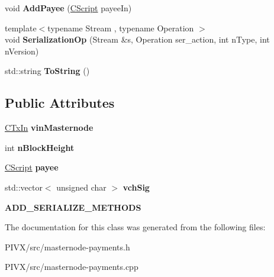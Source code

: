 \begin{DoxyCompactItemize}
void {\bfseries Add\+Payee} (\mbox{\hyperlink{class_c_script}{C\+Script}} payee\+In)
\item 
\mbox{\label{class_c_masternode_payment_winner_aa533f72a1a4fcee2b3d061d4e8b03bf6}} 
{\footnotesize template$<$typename Stream , typename Operation $>$ }\\void {\bfseries Serialization\+Op} (Stream \&s, Operation ser\+\_\+action, int n\+Type, int n\+Version)
\item 
\mbox{\label{class_c_masternode_payment_winner_a188f4b487f9481bdcc6d5b052793512e}} 
std\+::string {\bfseries To\+String} ()
\end{DoxyCompactItemize}
\subsection*{Public Attributes}
\begin{DoxyCompactItemize}
\item 
\mbox{\label{class_c_masternode_payment_winner_ab3242857185f9dbd6d38faeb31fdbe58}} 
\mbox{\hyperlink{class_c_tx_in}{C\+Tx\+In}} {\bfseries vin\+Masternode}
\item 
\mbox{\label{class_c_masternode_payment_winner_ae220dc7e74441f319751c24760ea670e}} 
int {\bfseries n\+Block\+Height}
\item 
\mbox{\label{class_c_masternode_payment_winner_a06110371aa9d82a6dbde904335cbfc5a}} 
\mbox{\hyperlink{class_c_script}{C\+Script}} {\bfseries payee}
\item 
\mbox{\label{class_c_masternode_payment_winner_a35844d9486f2c41ebf949e13d595247d}} 
std\+::vector$<$ unsigned char $>$ {\bfseries vch\+Sig}
\item 
\mbox{\label{class_c_masternode_payment_winner_a9617f0ec9ed362ef9035235574fb1d4d}} 
{\bfseries A\+D\+D\+\_\+\+S\+E\+R\+I\+A\+L\+I\+Z\+E\+\_\+\+M\+E\+T\+H\+O\+DS}
\end{DoxyCompactItemize}


The documentation for this class was generated from the following files\+:\begin{DoxyCompactItemize}
\item 
P\+I\+V\+X/src/masternode-\/payments.\+h\item 
P\+I\+V\+X/src/masternode-\/payments.\+cpp\end{DoxyCompactItemize}

